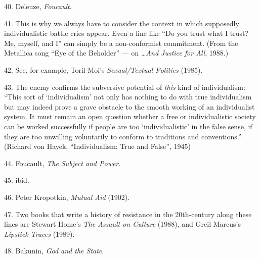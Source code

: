 {    40. Deleuze, \textit{Foucault}.

    41. This is why we always have to consider the context in which supposedly
    individualistic battle cries appear. Even a line like “Do you trust what I
    trust? Me, myself, and I” can simply be a non-conformist commitment. (From
    the Metallica song “Eye of the Beholder” — on \textit{…And Justice for All},
    1988.)

    42. See, for example, Toril Moi’s \textit{Sexual/Textual Politics} (1985).

    43. The enemy confirms the subversive potential of \textit{this} kind of
    individualism: “This sort of ‘individualism’ not only has nothing to do with
    true individualism but may indeed prove a grave obstacle to the smooth
    working of an individualist system. It must remain an open question whether
    a free or individualistic society can be worked successfully if people are
    too ‘individualistic’ in the false sense, if they are too unwilling
    voluntarily to conform to traditions and conventions.” (Richard von Hayek,
    “Individualism: True and False”, 1945)

    44. Foucault, \textit{The Subject and Power}.

    45. ibid.

    46. Peter Kropotkin, \textit{Mutual Aid} (1902).

    47. Two books that write a history of resistance in the 20th-century along
    these lines are Stewart Home’s \textit{The Assault on Culture} (1988), and
    Greil Marcus’s \textit{Lipstick Traces} (1989).

    48. Bakunin, \textit{God and the State}.

}
